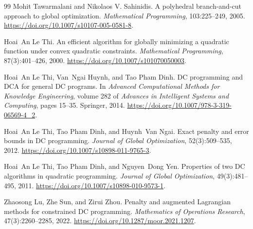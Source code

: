\documentclass[pdflatex,sn-mathphys-num]{sn-jnl}
\theoremstyle{thmstyleone}
\theoremstyle{thmstylethree}
\newcounter{algorithm}
\begin{document}
\begin{thebibliography}{99}
Mohit Tawarmalani and Nikolaos V. Sahinidis.
\newblock A polyhedral branch-and-cut approach to global optimization.
\newblock \emph{Mathematical Programming}, 103:225--249, 2005.
\newblock \url{https://doi.org/10.1007/s10107-005-0581-8}.


Hoai~An {Le Thi}.
\newblock An efficient algorithm for globally minimizing a quadratic function
  under convex quadratic constraints.
\newblock \emph{Mathematical Programming}, 87(3):401--426, 2000.
\newblock \url{https://doi.org/10.1007/s101070050003}.

Hoai~An {Le Thi}, Van~Ngai Huynh, and Tao {Pham Dinh}.
\newblock DC programming and DCA for general DC programs.
\newblock In \emph{Advanced Computational Methods for Knowledge Engineering},
  volume 282 of \emph{Advances in Intelligent Systems and Computing},
  pages 15--35. Springer, 2014.
\newblock \url{https://doi.org/10.1007/978-3-319-06569-4_2}.

Hoai~An {Le Thi}, Tao {Pham Dinh}, and Huynh~Van Ngai.
\newblock Exact penalty and error bounds in DC programming.
\newblock \emph{Journal of Global Optimization}, 52(3):509--535, 2012.
\newblock \url{https://doi.org/10.1007/s10898-011-9765-3}.

Hoai~An {Le Thi}, Tao {Pham Dinh}, and Nguyen~Dong Yen.
\newblock Properties of two DC algorithms in quadratic programming.
\newblock \emph{Journal of Global Optimization}, 49(3):481--495, 2011.
\newblock \url{https://doi.org/10.1007/s10898-010-9573-1}.

Zhaosong Lu, Zhe Sun, and Zirui Zhou.
\newblock Penalty and augmented Lagrangian methods for constrained DC programming.
\newblock \emph{Mathematics of Operations Research}, 47(3):2260--2285, 2022.
\newblock \url{https://doi.org/10.1287/moor.2021.1207}.


\end{thebibliography}
\end{document}

